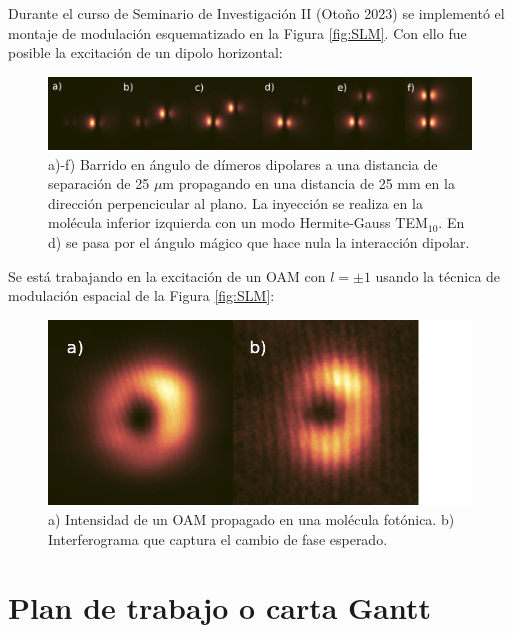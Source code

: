 \documentclass{article}
\begin{document}
Durante el curso de Seminario de Investigación II (Otoño 2023) se implementó el montaje de modulación esquematizado en la Figura \ref{fig:SLM}. Con ello fue posible la excitación de un dipolo horizontal:

\begin{figure}[H]
	\centering
	\includegraphics[width=1.0\linewidth]{./media/dipoles.jpg}
	\caption{a)-f) Barrido en ángulo de dímeros dipolares a una distancia de separación de 25 $\mu$m propagando en una distancia de 25 mm en la dirección perpencicular al plano. La inyección se realiza en la molécula inferior izquierda con un modo Hermite-Gauss TEM$_{10}$. En d) se pasa por el ángulo mágico que hace nula la interacción dipolar.}
\end{figure}

Se está trabajando en la excitación de un OAM con $l = \pm 1$ usando la técnica de modulación espacial de la Figura \ref{fig:SLM}:

\begin{figure}[H]
	\centering
	\includegraphics[width=0.7\linewidth]{./media/vortex.png}
	\caption{a) Intensidad de un OAM propagado en una molécula fotónica. b) Interferograma que captura el cambio de fase esperado.}
\end{figure} 

\section{Plan de trabajo o carta Gantt}


\renewcommand\refname{Referencias}


\end{document}
